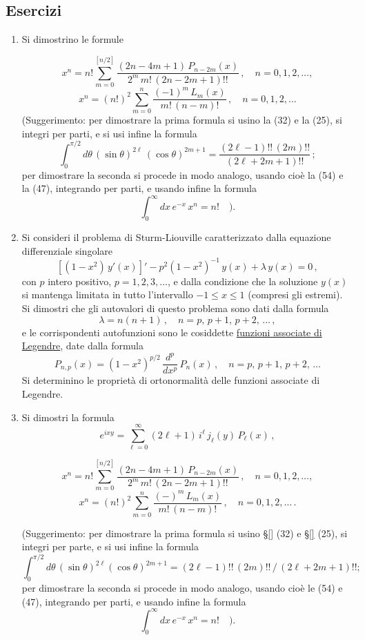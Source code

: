 \documentclass[11pt, a4paper]{book}
\numberwithin{equation}{section}
\newenvironment{esercizi}{\subsection*{Esercizi}\begin{enumerate}}{\end{enumerate}}
\begin{document}
\begin{esercizi}
\begin{enumerate}
\item[14.] Si dimostrino le formule


\[
x^n = n! \sum_{m=0}^{[n/2]} \frac{(2n-4m+1)\, P_{n-2m}(x)}{2^m\, m!\, (2n-2m+1)!!} \,, \quad n=0,1,2,\ldots,
\]
\[
x^n = (n!)^2 \sum_{m=0}^{n} \frac{(-1)^m\, L_m(x)}{m!\,(n-m)!} \,, \quad n=0,1,2,\ldots
\]
(Suggerimento: per dimostrare la prima formula si usino la (32) e
la (25), si integri per parti, e si usi infine la formula
\[
\int_0^{\pi/2} d\theta\, (\sin\theta)^{2\ell}\, (\cos\theta)^{2m+1} = \frac{(2\ell-1)!!\,(2m)!!}{(2\ell+2m+1)!!} \,;
\]
per dimostrare la seconda si procede in modo analogo, usando
cioè la (54) e la (47), integrando per parti, e usando infine la formula
\[
\int_0^{\infty} dx\, e^{-x}\, x^n = n! \quad ).
\]

\item[15.] Si consideri il problema di Sturm-Liouville caratterizzato dalla
equazione differenziale singolare
\[
\left[(1-x^2)\, y'(x)\right]' - p^2(1-x^2)^{-1}\, y(x) + \lambda\, y(x) = 0 \,,
\]
con $p$ intero positivo, $p=1,2,3,\ldots$, e dalla condizione che la soluzione $y(x)$ si mantenga limitata in tutto l'intervallo $-1 \leq x \leq 1$
(compresi gli estremi). Si dimostri che gli autovalori di questo
problema sono dati dalla formula
\[
\lambda = n(n+1) \,, \quad n = p,\, p+1,\, p+2,\, \ldots\,,
\]
e le corrispondenti autofunzioni sono le cosiddette \uline{funzioni associate
di Legendre}, date dalla formula
\[
P_{n,p}(x) = (1-x^2)^{p/2}\, \frac{d^p}{dx^p}\, P_n(x) \,, \quad n = p,\, p+1,\, p+2,\, \ldots
\]
Si determinino le proprietà di ortonormalità delle funzioni associate
di Legendre.

\item[16.] Si dimostri la formula
\[
e^{ixy} = \sum_{\ell=0}^{\infty} (2\ell+1)\, i^\ell\, j_\ell(y)\, P_\ell(x) \,,
\]

\[
x^n = n!\sum_{m=0}^{[n/2]} \frac{(2n-4m+1)\, P_{n-2m}(x)}{2^m\, m!\, (2n-2m+1)!!}\,, \quad n=0,1,2,\ldots,
\] 
\[
x^n = (n!)^2 \sum_{m=0}^{n} \frac{(-)^m\, L_m(x)}{m!\,(n-m)!}\,, \quad n=0,1,2,\ldots\,.
\]

(Suggerimento: per dimostrare la prima formula si usino \S\ref{} (32)
e \S\ref{} (25), si integri per parte, e si usi infine la formula
\[
\int_0^{\pi/2} d\theta\, (\sin\theta)^{2\ell}(\cos\theta)^{2m+1}
= (2\ell-1)!!\,(2m)!!\,/\,(2\ell+2m+1)!!;
\]
per dimostrare la seconda si procede in modo analogo, usando cioè le (54) e (47), integrando per parti, e usando infine la formula
\[
\int_0^{\infty} dx\, e^{-x}\, x^n = n!\quad ).
\]


\end{enumerate}
\end{esercizi}
\end{document}
